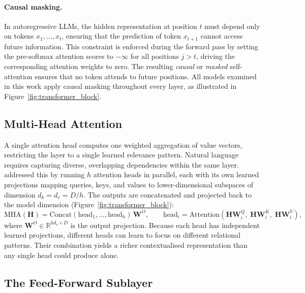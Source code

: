 \paragraph{Causal masking.}
In autoregressive LLMs, the hidden representation at position $t$ must depend only on
tokens $x_1, \ldots, x_t$, ensuring that the prediction of token $x_{t+1}$ cannot
access future information. This constraint is enforced during the forward pass by
setting the pre-softmax attention scores to $-\infty$ for all positions $j > t$,
driving the corresponding attention weights to zero. The resulting \emph{causal} or
\emph{masked} self-attention ensures that no token attends to future positions. All
models examined in this work apply causal masking throughout every layer, as
illustrated in Figure~\ref{fig:transformer_block}.

\subsection{Multi-Head Attention}
\label{subsec:mha}
A single attention head computes one weighted aggregation of value vectors, restricting 
the layer to a single learned relevance pattern. Natural language requires capturing 
diverse, overlapping dependencies within the same layer. \citet{vaswani2017attention} 
addressed this by running $h$ attention heads in parallel, each with its own learned 
projections mapping queries, keys, and values to lower-dimensional subspaces of dimension $d_k = d_v = D/h$. The outputs are concatenated and projected back 
to the model dimension (Figure~\ref{fig:transformer_block}):
\begin{equation}
    \text{MHA}(\mathbf{H}) =
    \text{Concat}(\text{head}_1, \ldots, \text{head}_h)\,\mathbf{W}^O,
    \qquad
    \text{head}_i = \text{Attention}\!\left(
        \mathbf{H}\mathbf{W}^Q_i,\;
        \mathbf{H}\mathbf{W}^K_i,\;
        \mathbf{H}\mathbf{W}^V_i
    \right),
    \label{eq:mha}
\end{equation}
where $\mathbf{W}^O \in \mathbb{R}^{h d_v \times D}$ is the output projection.
Because each head has independent learned projections, different heads can learn to
focus on different relational patterns. Their combination yields a richer
contextualised representation than any single head could produce alone.
\subsection{The Feed-Forward Sublayer}
\label{subsec:ffn}


